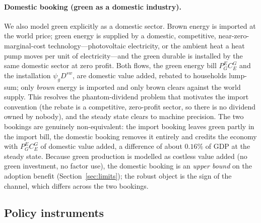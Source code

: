 \documentclass[11pt,a4paper]{article}
\begin{document}
\paragraph{Domestic booking (green as a domestic industry).} We also model green
explicitly as a domestic sector. Brown energy is imported at the world price;
green energy is supplied by a domestic, competitive, near-zero-marginal-cost
technology---photovoltaic electricity, or the ambient heat a heat pump moves per
unit of electricity---and the green durable is installed by the same domestic
sector at zero profit. Both flows, the green energy bill $P^{E}_{G}C^{G}_{E}$
and the installation $\psi_g D^{sw}$, are domestic value added, rebated to
households lump-sum; only \emph{brown} energy is imported and only brown clears
against the world supply. This resolves the phantom-dividend problem that
motivates the import convention (the rebate is a competitive, zero-profit
sector, so there is no dividend owned by nobody), and the steady state clears to
machine precision. The two bookings are genuinely non-equivalent: the import
booking leaves green partly in the import bill, the domestic booking removes it
entirely and credits the economy with $P^{E}_{G}C^{G}_{E}$ of domestic value
added, a difference of about $0.16\%$ of GDP at the steady state. Because green
production is modelled as costless value added (no green investment, no factor
use), the domestic booking is an \emph{upper bound} on the adoption benefit
(Section~\ref{sec:limits}); the robust object is the sign of the channel, which
differs across the two bookings.

\subsection{Policy instruments}
\end{document}
